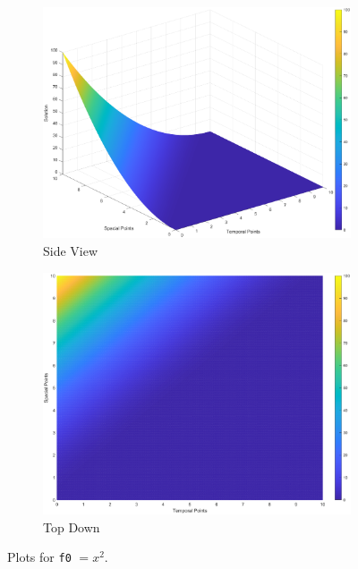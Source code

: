 \documentclass[]{article}
\def\incode#1{\texttt{#1}}
\begin{document}
	\begin{figure}[htbp]
		\centering
		\begin{subfigure}[b]{0.45\textwidth}
			\includegraphics[width=\textwidth]{images/f1_side.eps}
			\caption{Side View}
		\end{subfigure}
		\hfill
		\begin{subfigure}[b]{0.45\textwidth}
			\includegraphics[width=\textwidth]{images/f1_top.eps}
			\caption{Top Down}
		\end{subfigure}
		\caption{Plots for \incode{f0} $= x^2$.}
		\label{fig:both_images}
	\end{figure}
\end{document}
